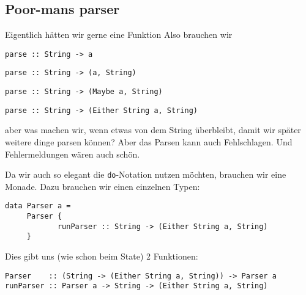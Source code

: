 \documentclass{beamer}
\begin{document}
\subsection{Poor-mans parser}
\begin{frame}[fragile]
\begin{overprint}
Eigentlich hätten wir gerne eine Funktion
Also brauchen wir
\end{overprint}
\begin{overprint}
\begin{verbatim}
parse :: String -> a
\end{verbatim}
\begin{verbatim}
parse :: String -> (a, String)
\end{verbatim}
\begin{verbatim}
parse :: String -> (Maybe a, String)
\end{verbatim}
\begin{verbatim}
parse :: String -> (Either String a, String)
\end{verbatim}
\end{overprint}
\begin{overprint}
aber was machen wir, wenn etwas von dem String überbleibt, damit wir später weitere dinge parsen können?
Aber das Parsen kann auch Fehlschlagen.
Und Fehlermeldungen wären auch schön.
\end{overprint}
\pause
\pause
\pause
\pause
\pause
\pause
Da wir auch so elegant die \texttt{do}-Notation nutzen möchten, brauchen wir eine Monade. Dazu brauchen wir einen einzelnen Typen:\\
\pause
\begin{verbatim}
data Parser a = 
     Parser {
            runParser :: String -> (Either String a, String)
     }
\end{verbatim}
\pause
Dies gibt uns (wie schon beim State) 2 Funktionen:
\begin{verbatim}
Parser    :: (String -> (Either String a, String)) -> Parser a
runParser :: Parser a -> String -> (Either String a, String)
\end{verbatim}
\end{frame}
\end{document}
